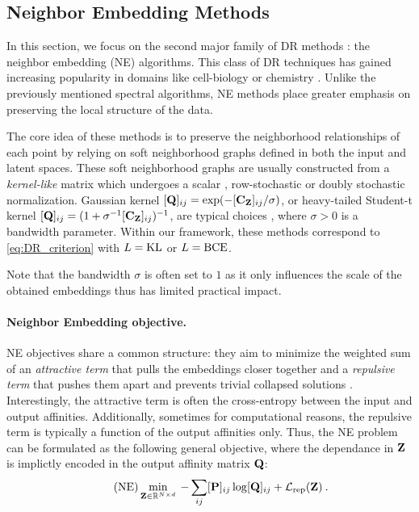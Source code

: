 \subsection{Neighbor Embedding Methods}\label{sec:neighbor_embedding}

In this section, we focus on the second major family of DR methods : the neighbor embedding (NE) algorithms. This class of DR techniques has gained increasing popularity in domains like cell-biology \citep{kobak2019art} or chemistry \citep{mai2022machine}. Unlike the previously mentioned spectral algorithms, NE methods place greater emphasis on preserving the local structure of the data.

The core idea of these methods is to preserve the neighborhood relationships of each point by relying on soft neighborhood graphs defined in both the input and latent spaces. These soft neighborhood graphs are usually constructed from a \emph{kernel-like} matrix which undergoes a scalar \citep{van2008visualizing}, row-stochastic \citep{hinton2002stochastic} or doubly stochastic \citep{lu2019doubly,van2023snekhorn} normalization. Gaussian kernel $[{\mathbf{Q}}]_{ij} = \exp(- [{\mathbf{C}}_{{\mathbf{Z}}}]_{ij} / \sigma)$, or heavy-tailed Student-t kernel $[{\mathbf{Q}}]_{ij} = (1+\sigma^{-1}[{\mathbf{C}}_{{\mathbf{Z}}}]_{ij})^{-1}$, are typical choices \citep{van2008visualizing}, where $\sigma > 0$ is a bandwidth parameter.
Within our framework, these methods correspond to \cref{eq:DR_criterion} with $L = \operatorname{KL}$ or $L=\operatorname{BCE}$.

\begin{remark}
    Note that the bandwidth $\sigma$ is often set to $1$ as it only influences the scale of the obtained embeddings thus has limited practical impact.
\end{remark}

\paragraph{Neighbor Embedding objective.}
NE objectives share a common structure: they aim to minimize the weighted sum of an \emph{attractive term} that pulls the embeddings closer together and a \emph{repulsive term} that pushes them apart and prevents trivial collapsed solutions \citep{van2022probabilistic}. Interestingly, the attractive term is often the cross-entropy between the input and output affinities. Additionally, sometimes for computational reasons, the repulsive term is typically a function of the output affinities only. Thus, the NE problem can be formulated as the following general objective, where the dependance in ${\mathbf{Z}}$ is implictly encoded in the output affinity matrix ${\mathbf{Q}}$:
\begin{align}\tag{NE}\label{eq:ne_attraction_repulsion}
    \min_{{\mathbf{Z}} \in \mathbb{R}^{N \times d}} \: - \sum_{ij} [{\mathbf{P}}]_{ij} \log [{\mathbf{Q}}]_{ij} + \mathcal{L}_{\mathrm{rep}}({\mathbf{Z}}) \:.
\end{align}


